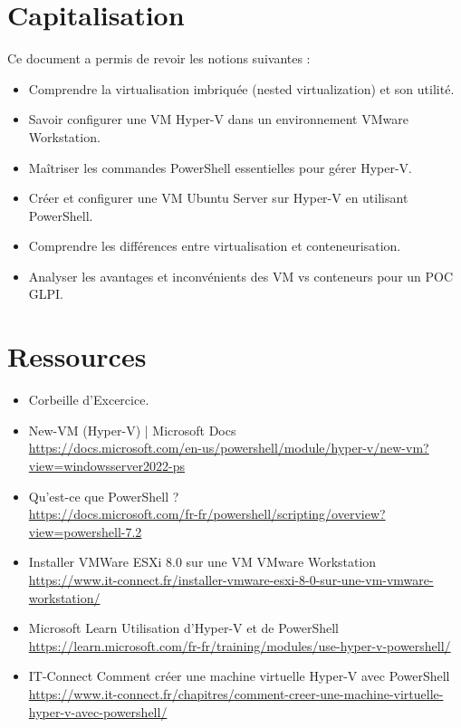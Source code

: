 \section*{Capitalisation}
\noindent Ce document a permis de revoir les notions suivantes :
\begin{itemize}
  \item Comprendre la virtualisation imbriquée (nested virtualization) et son utilité.
  \item Savoir configurer une VM Hyper-V dans un environnement VMware Workstation.
  \item Maîtriser les commandes PowerShell essentielles pour gérer Hyper-V.
  \item Créer et configurer une VM Ubuntu Server sur Hyper-V en utilisant PowerShell.
  \item Comprendre les différences entre virtualisation et conteneurisation.
  \item Analyser les avantages et inconvénients des VM vs conteneurs pour un POC GLPI.
\end{itemize}

\newpage

\section*{Ressources}
\begin{itemize}
  \item Corbeille d'Excercice.
  \item New-VM (Hyper-V) | Microsoft Docs\\
  \url{https://docs.microsoft.com/en-us/powershell/module/hyper-v/new-vm?view=windowsserver2022-ps}
  \item Qu'est-ce que PowerShell ?\\
  \url{https://docs.microsoft.com/fr-fr/powershell/scripting/overview?view=powershell-7.2}
  \item Installer VMWare ESXi 8.0 sur une VM VMware Workstation\\
  \url{https://www.it-connect.fr/installer-vmware-esxi-8-0-sur-une-vm-vmware-workstation/}
  \item Microsoft Learn Utilisation d'Hyper-V et de PowerShell\\
  \url{https://learn.microsoft.com/fr-fr/training/modules/use-hyper-v-powershell/}
  \item IT-Connect Comment créer une machine virtuelle Hyper-V avec PowerShell\\
  \url{https://www.it-connect.fr/chapitres/comment-creer-une-machine-virtuelle-hyper-v-avec-powershell/}
\end{itemize}